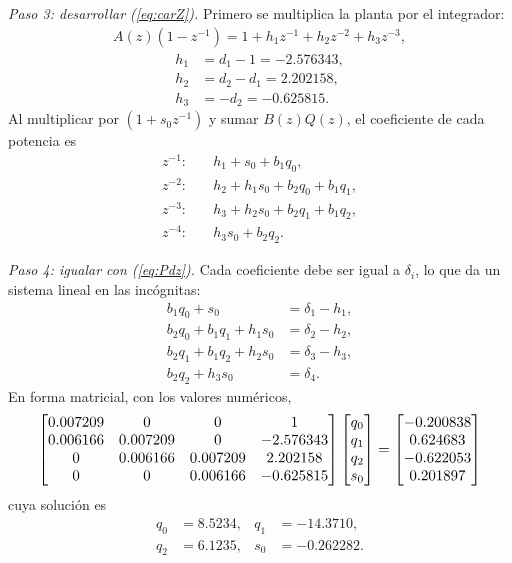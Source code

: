 \documentclass[conference]{IEEEtran}
\begin{document}
\textit{Paso 3: desarrollar (\ref{eq:carZ}).} Primero se multiplica la planta
por el integrador:
\begin{align*}
  A(z)(1-z^{-1}) = 1 + h_1z^{-1} + h_2z^{-2} + h_3z^{-3},
\end{align*}
\begin{align*}
  h_1 &= d_1 - 1 = -2.576343,\\
  h_2 &= d_2 - d_1 = 2.202158,\\
  h_3 &= -d_2 = -0.625815.
\end{align*}
Al multiplicar por $(1+s_0z^{-1})$ y sumar $B(z)Q(z)$, el coeficiente de cada
potencia es
\begin{align*}
  z^{-1}:&\quad h_1 + s_0 + b_1q_0,\\
  z^{-2}:&\quad h_2 + h_1s_0 + b_2q_0 + b_1q_1,\\
  z^{-3}:&\quad h_3 + h_2s_0 + b_2q_1 + b_1q_2,\\
  z^{-4}:&\quad h_3s_0 + b_2q_2.
\end{align*}

\textit{Paso 4: igualar con (\ref{eq:Pdz}).} Cada coeficiente debe ser igual a
$\delta_i$, lo que da un sistema lineal en las incógnitas:
\begin{align*}
  b_1q_0 + s_0 &= \delta_1 - h_1,\\
  b_2q_0 + b_1q_1 + h_1s_0 &= \delta_2 - h_2,\\
  b_2q_1 + b_1q_2 + h_2s_0 &= \delta_3 - h_3,\\
  b_2q_2 + h_3s_0 &= \delta_4.
\end{align*}
En forma matricial, con los valores numéricos,
\begin{align*}
\resizebox{0.92\linewidth}{!}{$
\begin{bmatrix}
 0.007209 & 0 & 0 & 1\\
 0.006166 & 0.007209 & 0 & -2.576343\\
 0 & 0.006166 & 0.007209 & 2.202158\\
 0 & 0 & 0.006166 & -0.625815
\end{bmatrix}
\begin{bmatrix} q_0\\ q_1\\ q_2\\ s_0 \end{bmatrix}
=
\begin{bmatrix} -0.200838\\ 0.624683\\ -0.622053\\ 0.201897 \end{bmatrix}
$}
\end{align*}
cuya solución es
\begin{align*}
  q_0 &= 8.5234, & q_1 &= -14.3710,\\
  q_2 &= 6.1235, & s_0 &= -0.262282.
\end{align*}
\end{document}
